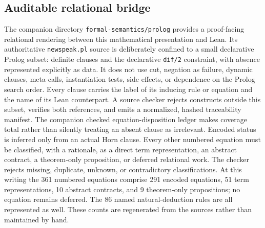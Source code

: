 \documentclass[11pt]{article}
\numberwithin{equation}{section}
\begin{document}
\subsection{Auditable relational bridge}
\label{sec:prolog-bridge}

The companion directory \texttt{formal-semantics/prolog} provides a
proof-facing relational rendering between this mathematical presentation and
Lean.  Its authoritative \texttt{newspeak.pl} source is deliberately confined
to a small declarative Prolog subset: definite clauses and the declarative
\texttt{dif/2} constraint, with absence represented explicitly as data.  It
does not use cut, negation as failure, dynamic clauses, meta-calls,
instantiation tests, side effects, or dependence on the Prolog search order.
Every clause carries the label of its inducing rule or equation and the name
of its Lean counterpart.  A source checker rejects constructs outside this
subset, verifies both references, and emits a normalized, hashed traceability
manifest.
The companion checked equation-disposition ledger makes coverage total rather
than silently treating an absent clause as irrelevant.  Encoded status is
inferred only from an actual Horn clause.  Every other numbered equation must
be classified, with a rationale, as a direct term representation, an abstract
contract, a theorem-only proposition, or deferred relational work.  The
checker rejects missing, duplicate, unknown, or contradictory classifications.
At this writing the 361 numbered equations comprise 291 encoded equations, 51
term representations, 10 abstract contracts, and 9 theorem-only propositions;
no equation remains deferred.  The 86 named natural-deduction rules are all
represented as well.  These counts are regenerated from the sources rather
than maintained by hand.
\end{document}
